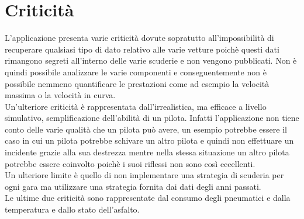 \section[Criticità]{Criticità} %
L'applicazione presenta varie criticità dovute sopratutto all'impossibilità di recuperare qualsiasi tipo di dato relativo alle varie vetture poichè questi dati rimangono segreti all'interno delle varie scuderie e non vengono pubblicati. Non è quindi possibile analizzare le varie componenti e conseguentemente non è possibile nemmeno quantificare le prestazioni come ad esempio la velocità massima o la velocità in curva.\\
Un'ulteriore criticità è rappresentata dall'irrealistica, ma efficace a livello simulativo, semplificazione dell'abilità di un pilota. Infatti l'applicazione non tiene conto delle varie qualità che un pilota può avere, un esempio potrebbe essere il caso in cui un pilota potrebbe schivare un altro pilota e quindi non effettuare un incidente grazie alla sua destrezza mentre nella stessa situazione un altro pilota potrebbe essere coinvolto poichè i suoi riflessi non sono così eccellenti.\\
Un ulteriore limite è quello di non implementare una strategia di scuderia per ogni gara ma utilizzare una strategia fornita dai dati degli anni passati.\\
Le ultime due criticità sono rappresentate dal consumo degli pneumatici e dalla temperatura e dallo stato dell'asfalto.

